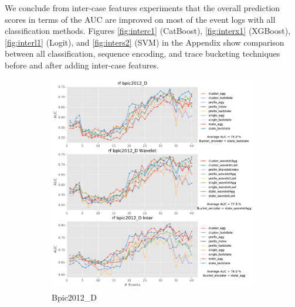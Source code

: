 We conclude from inter-case features experiments that the overall prediction scores in terms of the AUC are improved on most of the event logs with all classification methods. Figures \ref{fig:interc1} (CatBoost), \ref{fig:interx1} (XGBoost), \ref{fig:interl1} (Logit), and \ref{fig:inters2} (SVM) in the Appendix show comparison between all classification, sequence encoding, and trace bucketing techniques before and after adding inter-case features.  

\begin{figure}[!htbp] %

	\begin{subfigure}{0.48\textwidth}
		\includegraphics[width=\linewidth]{images/inter/rf/bpic2012_D.pdf}
		\caption{Bpic2012\_D} \label{fig:b12di}
	\end{subfigure}\hspace*{\fill}
	\begin{subfigure}{0.48\textwidth}

\end{subfigure}
\end{figure}
